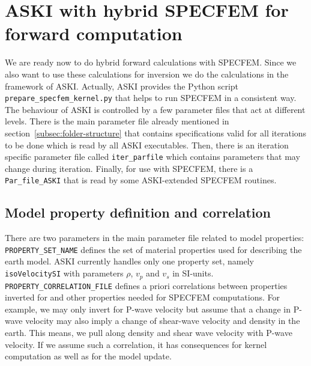 %
\section{ASKI with hybrid SPECFEM for forward computation}
%
We are ready now to do hybrid forward calculations with SPECFEM. Since we also want to use these calculations for inversion we do the calculations in the framework of ASKI. Actually, ASKI provides the Python script \verb+prepare_specfem_kernel.py+ that helps to run SPECFEM in a consistent way. The behaviour of ASKI is controlled by a few parameter files that act at different levels. There is the main parameter file already mentioned in section~\ref{subsec:folder-structure} that contains specifications valid for all iterations to be done which is read by all ASKI executables. Then, there is an iteration specific parameter file called \verb+iter_parfile+ which contains parameters that may change during iteration. Finally, for use with SPECFEM, there is a \verb+Par_file_ASKI+ that is read by some ASKI-extended SPECFEM routines.
%
\subsection{Model property definition and correlation}
\label{subsec:property-correlation}
%
 There are two parameters in the main parameter file related to model properties: \verb+PROPERTY_SET_NAME+ defines the set of material properties used for describing the earth model. ASKI currently handles only one property set, namely \verb+isoVelocitySI+ with parameters $\rho$, $v_p$ and $v_s$ in SI-units. \verb+PROPERTY_CORRELATION_FILE+ defines a priori correlations between properties inverted for and other properties needed for SPECFEM computations.
 For example, we may only invert for P-wave velocity but assume that a change in P-wave velocity may also imply a change of shear-wave velocity and density in the earth. This means, we pull along density and shear wave velocity with P-wave velocity. If we assume such a correlation, it has consequences for kernel computation as well as for the model update.

